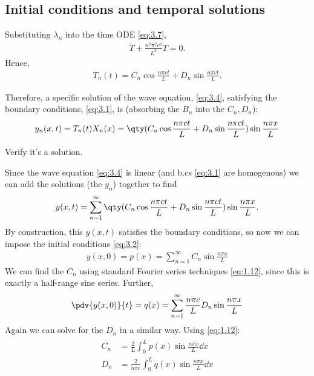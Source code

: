 \subsection{Initial conditions and temporal solutions}
Substituting $\lambda_n$ into the time ODE \cref{eq:3.7},
\begin{align*}
	\ddot T + \frac{n^2 \pi^2 c^2}{L^2}T = 0.
\end{align*}
Hence,
\begin{align} \label{eq:3.9}
	T_n(t) = C_n \cos \frac{n \pi c t}{L} + D_n \sin \frac{n \pi c t}{L}.
\end{align}

Therefore, a specific solution of the wave equation, \cref{eq:3.4}, satisfying the boundary conditions, \cref{eq:3.1}, is (absorbing the $B_n$ into the $C_n, D_n$):
\begin{align*}
	y_n(x,t) = T_n(t) X_n(x) = \qty(C_n \cos \frac{n \pi c t}{L} + D_n \sin \frac{n \pi c t}{L}) \sin \frac{n \pi x}{L}
\end{align*}

\begin{exercise}
	Verify it's a solution.
\end{exercise} 

Since the wave equation \cref{eq:3.4} is linear (and b.cs \cref{eq:3.1} are homogenous) we can add the solutions (the $y_n$) together to find 
\begin{align} \label{eq:3.10}
	y(x,t) = \sum_{n=1}^\infty \qty(C_n \cos \frac{n \pi c t}{L} + D_n \sin \frac{n \pi c t}{L}) \sin \frac{n \pi x}{L}.
\end{align}
By construction, this $y(x,t)$ satisfies the boundary conditions, so now we can impose the initial conditions \cref{eq:3.2}:
\begin{align*}
	y(x,0) = p(x) = \sum_{n=1}^\infty C_n \sin \frac{n \pi x}{L}
\end{align*}
We can find the $C_n$ using standard Fourier series techniques \cref{eq:1.12}, since this is exactly a half-range sine series.
Further,
\begin{align*}
	\pdv{y(x,0)}{t} = q(x) = \sum_{n=1}^\infty \frac{n \pi c}{L} D_n \sin \frac{n \pi x}{L}
\end{align*}
Again we can solve for the $D_n$ in a similar way.
Using \cref{eq:1.12}:
\begin{align}
	\begin{aligned} \label{eq:3.11}
		C_n &= \frac{2}{L} \int_0^L p(x) \sin \frac{n \pi x}{L} \dd{x} \\
		D_n &= \frac{2}{n \pi c} \int_0^L q(x) \sin \frac{n \pi x}{L} \dd{x}
	\end{aligned}
\end{align} 

